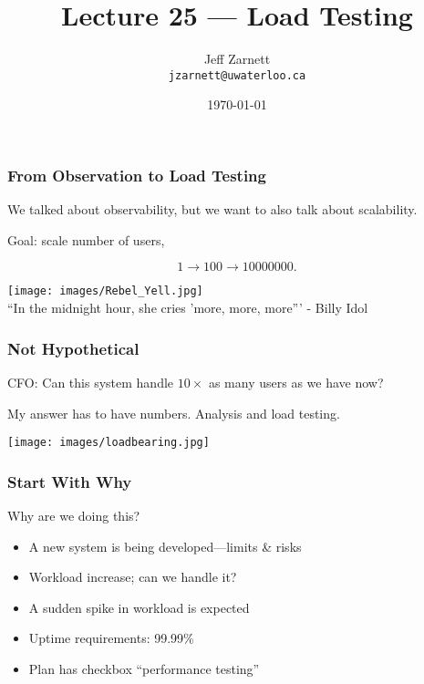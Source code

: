 

\title{Lecture 25 --- Load Testing}

\author{Jeff Zarnett\\ \small \texttt{jzarnett@uwaterloo.ca}}
\date{\today}




\begin{frame}
  \titlepage

\end{frame}

\begin{frame}
\frametitle{From Observation to Load Testing}

We talked about observability, but we want to also talk about scalability.

Goal: scale number of users,

\[ 1 \rightarrow 100 \rightarrow 10 000 000. \]


\begin{center}
	\texttt{[image: images/Rebel\_Yell.jpg]}\\
	\hfill ``In the midnight hour, she cries 'more, more, more''' - Billy Idol
\end{center}

\end{frame}


\begin{frame}
\frametitle{Not Hypothetical}

CFO: Can this system handle $10\times$ as many users as we have now?

My answer has to have numbers. Analysis and \alert{load testing}.

\begin{center}
  \texttt{[image: images/loadbearing.jpg]}
\end{center}

\end{frame}

\begin{frame}
\frametitle{Start With Why}
Why are we doing this?

\begin{itemize}
	\item A new system is being developed---limits \& risks
	\item Workload increase; can we handle it?
	\item A sudden spike in workload is expected
	\item Uptime requirements: 99.99\%
	\item Plan has checkbox ``performance testing''
\end{itemize}



\end{frame}

